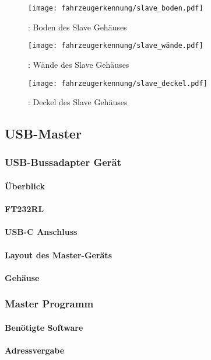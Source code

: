 \begin{figure}[!htb]
        \texttt{[image: fahrzeugerkennung/slave\_boden.pdf]}
        \caption{: Boden des Slave Gehäuses}
    \endminipage\hfill
        \texttt{[image: fahrzeugerkennung/slave\_wände.pdf]}
        \caption{: Wände des Slave Gehäuses}
    \endminipage\hfill
        \texttt{[image: fahrzeugerkennung/slave\_deckel.pdf]}
        \caption{: Deckel des Slave Gehäuses}
    \endminipage
    \end{figure}

\subsection{USB-Master}
\subsubsection{USB-Bussadapter Gerät}
\paragraph{Überblick}
\paragraph{FT232RL}
\paragraph{USB-C Anschluss}
\paragraph{Layout des Master-Geräts}
\paragraph{Gehäuse}

\subsubsection{Master Programm}
\paragraph{Benötigte Software}
\paragraph{Adressvergabe}
